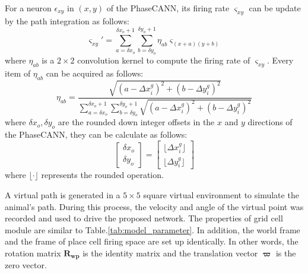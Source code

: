 \documentclass[preprint,12pt]{elsarticle}
\begin{document}
For a neuron $\epsilon_{xy}$ in $(x,y)$ of the PhaseCANN, its firing rate $\varsigma_{xy}$ can be update by the path integration as follows:
\begin{equation}\label{rate_path_integration}
	\varsigma_{xy}' = \sum_{a=\delta x_o }^{\delta x_o +1}\sum_{b=\delta y_o}^{\delta y_o +1} \eta_{ab} \varsigma_{(x+a)(y+b)}
\end{equation}
where $\eta_{ab}$ is a $2\times2$ convolution kernel to compute the firing rate of $\varsigma_{xy}$. Every item of $\eta_{ab}$ can be acquired as follows:
\begin{equation}\label{convolution_kernel}
	\eta_{ab} = \frac{\sqrt{(a-\Delta x_i^g)^2+(b-\Delta y_i^g)^2}}{\sum_{a=\delta x_o }^{\delta x_o +1}\sum_{b=\delta y_o}^{\delta y_o +1}\sqrt{(a-\Delta x_i^g)^2+(b-\Delta y_i^g)^2}}
\end{equation}
where $\delta x_o,\delta y_o $ are the rounded down integer offsets in the $x$ and $y$ directions of the PhaseCANN, they can be calculate as follows:
\begin{equation}\label{rounded-offsets}
	\begin{bmatrix}
		\delta x_o\\
		\delta y_o
	\end{bmatrix}
	= 	
	\begin{bmatrix}
		\lfloor \Delta x_i^g \rfloor\\
		\lfloor \Delta y_i^g \rfloor
	\end{bmatrix}
\end{equation}
where $\lfloor \cdot \rfloor$ represents the rounded operation.

A virtual path is generated in a $5\times5$ square virtual environment to simulate the animal's path. During this process, the velocity and angle of the virtual point was recorded and used to drive the proposed network. The properties of grid cell module are similar to Table.\ref{tab:model_parameter}. In addition, the world frame and the frame of place cell firing space are set up identically. In other words, the rotation matrix $\bm{R_{wp}}$ is the identity matrix and the translation vector $\boldsymbol{\varpi}$ is the zero vector. 
\end{document}
